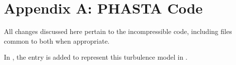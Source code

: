 \documentclass[11pt]{article}
\begin{document}
\section*{Appendix A: PHASTA Code} %

All changes discussed here pertain to the incompressible code, including files common to both when appropriate.

In , the entry  is added to represent this turbulence model in .




\end{document}
